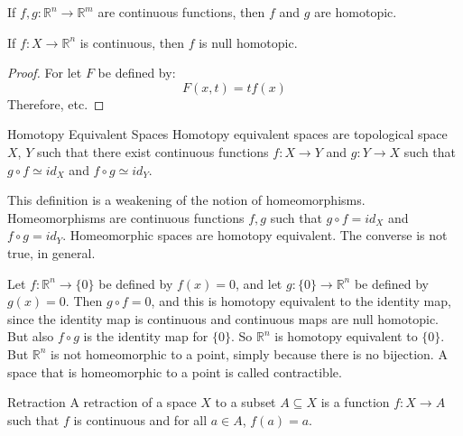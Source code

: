         \begin{theorem}
            If $f,g:\mathbb{R}^{n}\rightarrow\mathbb{R}^{m}$
            are continuous functions, then $f$ and $g$ are
            homotopic.
        \end{theorem}
        \begin{theorem}
            If $f:X\rightarrow\mathbb{R}^{n}$ is continuous,
            then $f$ is null homotopic.
        \end{theorem}
        \begin{proof}
            For let $F$ be defined by:
            \begin{equation}
                F(x,t)=tf(x)
            \end{equation}
            Therefore, etc.
        \end{proof}
        \begin{ldefinition}{Homotopy Equivalent Spaces}
            Homotopy equivalent spaces are topological
            space $X$, $Y$ such that there exist continuous
            functions $f:X\rightarrow{Y}$ and
            $g:Y\rightarrow{X}$ such that
            $g\circ{f}\simeq{id}_{X}$ and
            $f\circ{g}\simeq{id}_{Y}$.
        \end{ldefinition}
        This definition is a weakening of the notion of
        homeomorphisms. Homeomorphisms are continuous
        functions $f,g$ such that $g\circ{f}=id_{X}$ and
        $f\circ{g}=id_{Y}$. Homeomorphic spaces are homotopy
        equivalent. The converse is not true, in general.
        \begin{example}
            Let $f:\mathbb{R}^{n}\rightarrow\{0\}$ be
            defined by $f(x)=0$, and let
            $g:\{0\}\rightarrow\mathbb{R}^{n}$ be defined
            by $g(x)=0$. Then $g\circ{f}=0$, and this
            is homotopy equivalent to the identity map, since
            the identity map is continuous and continuous
            maps are null homotopic. But also
            $f\circ{g}$ is the identity map for
            $\{0\}$. So $\mathbb{R}^{n}$ is homotopy
            equivalent to $\{0\}$. But $\mathbb{R}^{n}$
            is not homeomorphic to a point, simply because
            there is no bijection. A space that is
            homeomorphic to a point is called contractible.
        \end{example}
        \begin{ldefinition}{Retraction}
            A retraction of a space $X$ to a subset
            $A\subseteq{X}$ is a function $f:X\rightarrow{A}$
            such that $f$ is continuous and
            for all $a\in{A}$, $f(a)=a$.
        \end{ldefinition}
